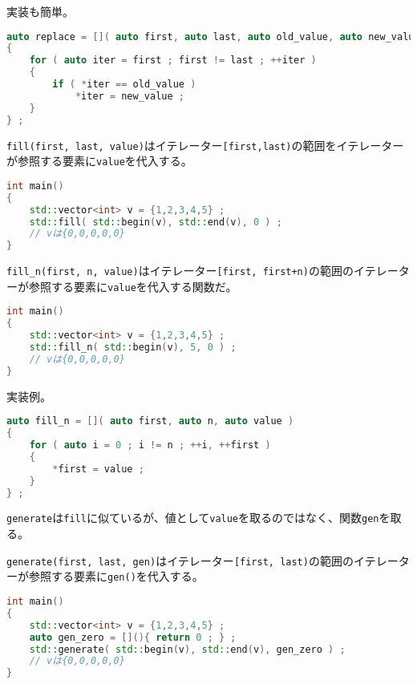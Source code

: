 実装も簡単。

\begin{lstlisting}[language={C++}]
auto replace = []( auto first, auto last, auto old_value, auto new_value )
{
    for ( auto iter = first ; first != last ; ++iter )
    {
        if ( *iter == old_value )
            *iter = new_value ;
    }
} ;
\end{lstlisting}


\texttt{fill(first, last, value)}はイテレーター\texttt{[first,last)}の範囲をイテレーターが参照する要素に\texttt{value}を代入する。

\begin{lstlisting}[language={C++}]
int main()
{
    std::vector<int> v = {1,2,3,4,5} ;
    std::fill( std::begin(v), std::end(v), 0 ) ;
    // vは{0,0,0,0,0}
}
\end{lstlisting}

\texttt{fill\_n(first, n, value)}はイテレーター\texttt{[first, first+n)}の範囲のイテレーターが参照する要素に\texttt{value}を代入する関数だ。

\ifTombow\pagebreak\fi
\begin{lstlisting}[language={C++}]
int main()
{
    std::vector<int> v = {1,2,3,4,5} ;
    std::fill_n( std::begin(v), 5, 0 ) ;
    // vは{0,0,0,0,0}
}
\end{lstlisting}

実装例。

\begin{lstlisting}[language={C++}]
auto fill_n = []( auto first, auto n, auto value )
{
    for ( auto i = 0 ; i != n ; ++i, ++first )
    {
        *first = value ;
    }
} ;
\end{lstlisting}


\texttt{generate}は\texttt{fill}に似ているが、値として\texttt{value}を取るのではなく、関数\texttt{gen}を取る。

\texttt{generate(first, last, gen)}はイテレーター\texttt{[first, last)}の範囲のイテレーターが参照する要素に\texttt{gen()}を代入する。

\begin{lstlisting}[language={C++}]
int main()
{
    std::vector<int> v = {1,2,3,4,5} ;
    auto gen_zero = [](){ return 0 ; } ;
    std::generate( std::begin(v), std::end(v), gen_zero ) ;
    // vは{0,0,0,0,0}
}
\end{lstlisting}

